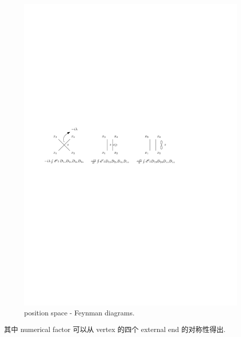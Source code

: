 \begin{itemize}
	\begin{figure}[H]
		\centering
		\includegraphics[scale=1]{figures/collision between particles - Feynman diagrams.pdf}
		\caption{position space - Feynman diagrams.}
	\end{figure}
	
	其中 numerical factor 可以从 vertex 的四个 external end 的对称性得出.
	

\end{itemize}
